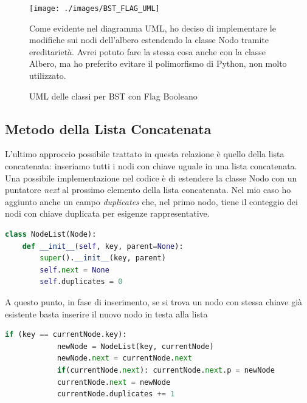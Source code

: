 \documentclass{article}
\begin{document}
\begin{figure}[htbp]
  \begin{minipage}{0.5\textwidth}
    \centering
    \texttt{[image: ./images/BST\_FLAG\_UML]}
    \caption{UML delle classi per BST con Flag Booleano}
    \label{fig:BST_FLAG_UML}
  \end{minipage}%
    \hspace{\columnsep}
      \hspace{\columnsep}
  \begin{minipage}{0.5\textwidth}
	Come evidente nel diagramma UML, ho deciso di implementare le modifiche sui nodi dell'albero estendendo la classe Nodo tramite ereditarietà. Avrei potuto fare la stessa cosa anche con la classe Albero, ma ho preferito evitare il polimorfismo di Python, non molto utilizzato.
  \end{minipage}
\end{figure}


\subsection{Metodo della Lista Concatenata}
\label{subsec:list-implementation}



L'ultimo approccio possibile trattato in questa relazione è quello  della lista concatenata: inseriamo tutti i nodi con chiave uguale in una lista concatenata.
Una possibile implementazione nel codice è di estendere la classe Nodo con un puntatore \textit{next} al prossimo elemento della lista concatenata. Nel mio caso ho aggiunto anche un campo   \textit{duplicates} che, nel primo nodo, tiene il conteggio dei nodi con chiave duplicata per esigenze rappresentative.

\begin{lstlisting}[language=Python, caption={Classe Nodo di un BST con lista concatenata}]
class NodeList(Node):
    def __init__(self, key, parent=None):
        super().__init__(key, parent)
        self.next = None
        self.duplicates = 0
\end{lstlisting}

A questo punto, in fase di inserimento, se si trova un nodo con stessa chiave già esistente basta inserire il nuovo nodo in testa alla lista

\begin{lstlisting}[language=Python, caption={Gestione chiavi duplicate con lista concatenata}]
        if (key == currentNode.key):
            newNode = NodeList(key, currentNode)
            newNode.next = currentNode.next
            if(currentNode.next): currentNode.next.p = newNode
            currentNode.next = newNode
            currentNode.duplicates += 1

\end{lstlisting}
\end{document}
